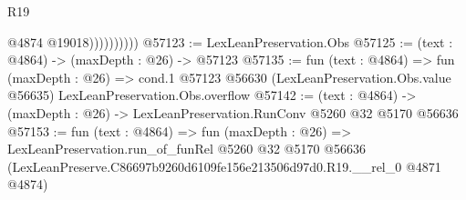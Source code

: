 \begin{lexlean}{R19}
\begin{coremodule}
                        @4874
                        @19018))))))))))
@57123 := LexLeanPreservation.Obs
@57125 := (text : @4864) -> (maxDepth : @26) -> @57123
@57135 := fun (text : @4864) =>
  fun (maxDepth : @26) =>
  cond.{1} @57123 @56630 (LexLeanPreservation.Obs.value @56635) LexLeanPreservation.Obs.overflow
@57142 := (text : @4864) -> (maxDepth : @26) -> LexLeanPreservation.RunConv @5260 @32 @5170 @56636
@57153 := fun (text : @4864) =>
  fun (maxDepth : @26) =>
  LexLeanPreservation.run_of_funRel
    @5260
    @32
    @5170
    @56636
    (LexLeanPreserve.C86697b9260d6109fe156e213506d97d0.R19.__rel_0 @4871 @4874)
\end{coremodule}
\end{lexlean}
